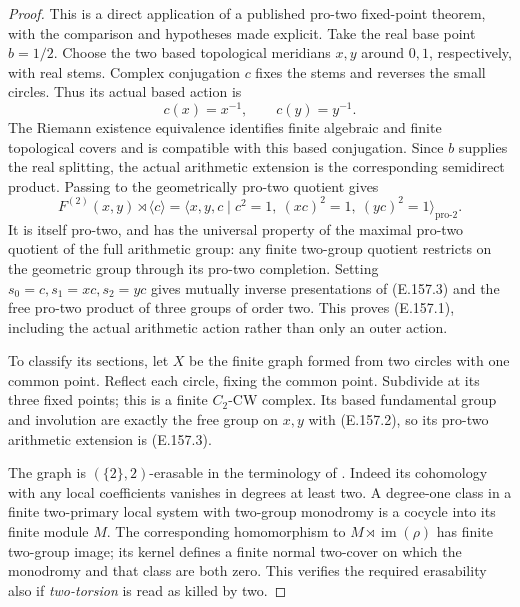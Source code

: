 \begin{proof}
This is a direct application of a published pro-two fixed-point
theorem, with the comparison and hypotheses made explicit.
Take the real base point \(b=1/2\). Choose the two based
topological meridians \(x,y\) around \(0,1\), respectively,
with real stems. Complex conjugation \(c\) fixes the stems
and reverses the small circles. Thus its actual based action
is
\[
                         c(x)=x^{-1},\qquad c(y)=y^{-1}.
 \tag{E.157.2}
\]
The Riemann existence equivalence
\citep[XII, Theorem~5.1, recomposed p.~251]{RootSGA1}
identifies finite algebraic and finite topological covers
and is compatible with this based conjugation. Since \(b\)
supplies the real splitting, the actual arithmetic extension
is the corresponding semidirect product. Passing to the
geometrically pro-two quotient gives
\[
 F^{(2)}(x,y)\rtimes\langle c\rangle
 =\langle x,y,c\mid c^2=1,\ (xc)^2=1,\ (yc)^2=1
                                      \rangle_{\mathrm{pro}\text{-}2}.
 \tag{E.157.3}
\]
It is itself pro-two, and has the universal property of the
maximal pro-two quotient of the full arithmetic group:
any finite two-group quotient restricts on the geometric
group through its pro-two completion. Setting
\(s_0=c,s_1=xc,s_2=yc\) gives mutually inverse presentations
of (E.157.3) and the free pro-two product of three groups
of order two. This proves (E.157.1), including the actual
arithmetic action rather than only an outer action.

To classify its sections, let \(X\) be the finite graph
formed from two circles with one common point. Reflect
each circle, fixing the common point. Subdivide at its
three fixed points; this is a finite \(C_2\)-CW complex.
Its based fundamental group and involution are exactly
the free group on \(x,y\) with (E.157.2), so its pro-two
arithmetic extension is (E.157.3).

The graph is \((\{2\},2)\)-erasable in the terminology of
\citet[Definition~1.2, author p.~2]{CohPal2011}.
Indeed its cohomology with any local coefficients vanishes
in degrees at least two. A degree-one class in a finite
two-primary local system with two-group monodromy is a
cocycle into its finite module \(M\). The corresponding
homomorphism to \(M\rtimes\operatorname{im}(\rho)\) has
finite two-group image; its kernel defines a finite
normal two-cover on which the monodromy and that class
are both zero. This verifies the required erasability
also if \emph{two-torsion} is read as killed by two.


\end{proof}
